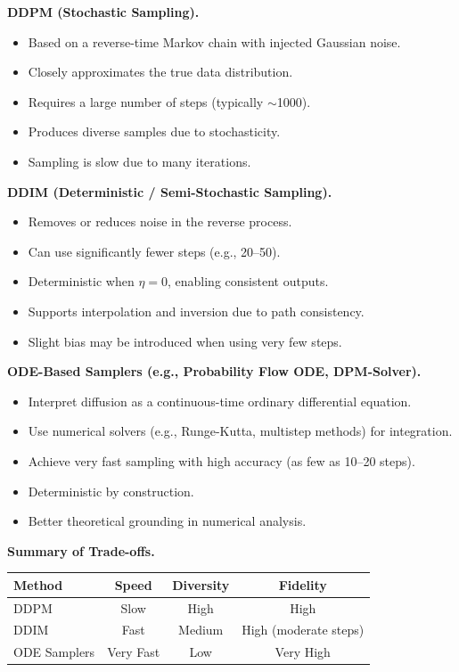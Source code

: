\vspace{0.5em}
\noindent
\textbf{DDPM (Stochastic Sampling).}
\begin{itemize}
    \item Based on a reverse-time Markov chain with injected Gaussian noise.
    \item Closely approximates the true data distribution.
    \item Requires a large number of steps (typically $\sim$1000).
    \item Produces diverse samples due to stochasticity.
    \item Sampling is slow due to many iterations.
\end{itemize}

\vspace{0.5em}
\noindent
\textbf{DDIM (Deterministic / Semi-Stochastic Sampling).}
\begin{itemize}
    \item Removes or reduces noise in the reverse process.
    \item Can use significantly fewer steps (e.g., 20--50).
    \item Deterministic when $\eta = 0$, enabling consistent outputs.
    \item Supports interpolation and inversion due to path consistency.
    \item Slight bias may be introduced when using very few steps.
\end{itemize}

\vspace{0.5em}
\noindent
\textbf{ODE-Based Samplers (e.g., Probability Flow ODE, DPM-Solver).}
\begin{itemize}
    \item Interpret diffusion as a continuous-time ordinary differential equation.
    \item Use numerical solvers (e.g., Runge-Kutta, multistep methods) for integration.
    \item Achieve very fast sampling with high accuracy (as few as 10--20 steps).
    \item Deterministic by construction.
    \item Better theoretical grounding in numerical analysis.
\end{itemize}

\vspace{0.5em}
\noindent
\textbf{Summary of Trade-offs.}

\begin{center}
\begin{tabular}{lccc}
\toprule
Method & Speed & Diversity & Fidelity \\
\midrule
DDPM & Slow & High & High \\
DDIM & Fast & Medium & High (moderate steps) \\
ODE Samplers & Very Fast & Low & Very High \\
\bottomrule
\end{tabular}
\end{center}

